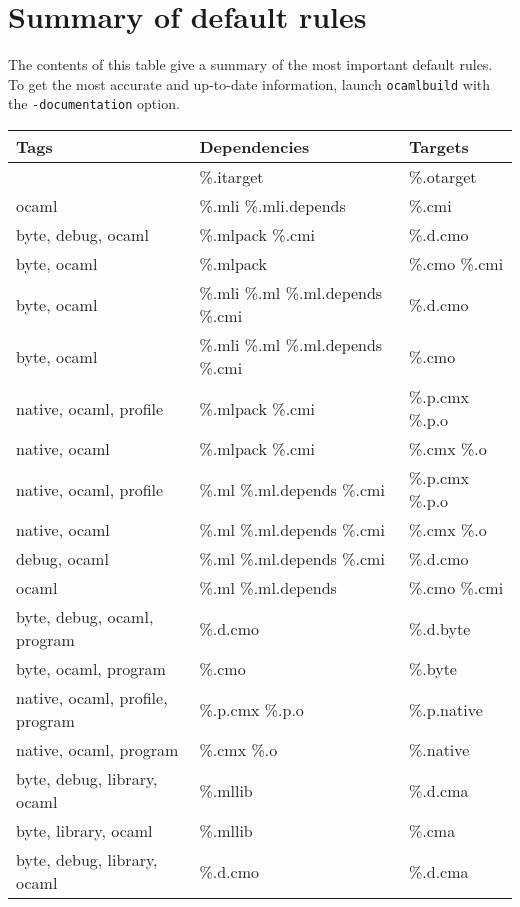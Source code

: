 \documentclass[9pt]{article}
\newcommand{\ocb}{\texttt{ocamlbuild}\xspace}
\begin{document}
\section{Summary of default rules}
The contents of this table give a summary of the most important default rules.
To get the most accurate and up-to-date information, launch \ocb with the
\texttt{-documentation} option.
\begin{center}
\small
\begin{tabular}{|l|l|p{5cm}|}
  \hline
   \textbf{Tags} & \textbf{Dependencies} & \textbf{Targets} \\
  \hline
  \hline
   &  \%.itarget  &  \%.otarget  \\
  \hline
   ocaml &  \%.mli \%.mli.depends  &  \%.cmi  \\
  \hline
   byte, debug, ocaml &  \%.mlpack \%.cmi &  \%.d.cmo  \\
  \hline
   byte, ocaml &  \%.mlpack  &  \%.cmo \%.cmi  \\
  \hline
   byte, ocaml &  \%.mli \%.ml \%.ml.depends \%.cmi  & \%.d.cmo  \\
  \hline
   byte, ocaml &  \%.mli \%.ml \%.ml.depends \%.cmi  & \%.cmo  \\
  \hline
   native, ocaml, profile & \%.mlpack \%.cmi  &  \%.p.cmx \%.p.o  \\
  \hline
   native, ocaml &  \%.mlpack \%.cmi &  \%.cmx \%.o  \\
  \hline
   native, ocaml, profile &  \%.ml \%.ml.depends \%.cmi  & \%.p.cmx \%.p.o  \\
  \hline
   native, ocaml &  \%.ml \%.ml.depends \%.cmi  & \%.cmx \%.o  \\
  \hline
   debug, ocaml &  \%.ml \%.ml.depends \%.cmi  & \%.d.cmo  \\
  \hline
   ocaml &  \%.ml \%.ml.depends  &  \%.cmo \%.cmi  \\
  \hline
   byte, debug, ocaml, program &  \%.d.cmo  &  \%.d.byte \\
  \hline
   byte, ocaml, program &  \%.cmo  &  \%.byte  \\
  \hline
   native, ocaml, profile, program &  \%.p.cmx \%.p.o  & \%.p.native  \\
  \hline
   native, ocaml, program &  \%.cmx \%.o  & \%.native  \\
  \hline
   byte, debug, library, ocaml &  \%.mllib  & \%.d.cma  \\
  \hline
   byte, library, ocaml &  \%.mllib  &  \%.cma  \\
  \hline
   byte, debug, library, ocaml &  \%.d.cmo  &  \%.d.cma  \\

\end{tabular}
\end{center}
\end{document}
